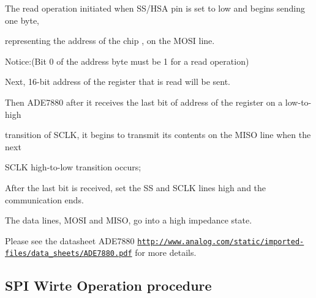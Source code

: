 \begin{DoxyItemize}
\item The read operation initiated when S\-S/\-H\-S\-A pin is set to low and begins sending one byte, \par
 representing the address of the chip , on the M\-O\-S\-I line. \par
 Notice\-:(\-Bit 0 of the address byte must be 1 for a read operation) \par
\end{DoxyItemize}
\begin{DoxyItemize}
\item Next, 16-\/bit address of the register that is read will be sent. \par
\end{DoxyItemize}
\begin{DoxyItemize}
\item Then A\-D\-E7880 after it receives the last bit of address of the register on a low-\/to-\/high \par
 transition of S\-C\-L\-K, it begins to transmit its contents on the M\-I\-S\-O line when the next \par
 S\-C\-L\-K high-\/to-\/low transition occurs; \par
\end{DoxyItemize}
\begin{DoxyItemize}
\item After the last bit is received, set the S\-S and S\-C\-L\-K lines high and the communication ends. \par
\end{DoxyItemize}
\begin{DoxyItemize}
\item The data lines, M\-O\-S\-I and M\-I\-S\-O, go into a high impedance state. \par
 \par
\end{DoxyItemize}
Please see the datasheet A\-D\-E7880 \href{http://www.analog.com/static/imported-files/data_sheets/ADE7880.pdf}{\tt http\-://www.\-analog.\-com/static/imported-\/files/data\-\_\-sheets/\-A\-D\-E7880.\-pdf} for more details. \par
\par
\par
\hypertarget{de/d5e/a00007_WRITE}{}\subsection{S\-P\-I Wirte Operation procedure}\label{de/d5e/a00007_WRITE}
 
